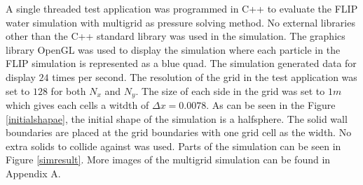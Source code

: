 A single threaded test application was programmed in C++ to evaluate the FLIP water simulation with multigrid as pressure solving method. No external libraries other than the C++ standard library was used in the simulation. The graphics library OpenGL was used to display the simulation where each particle in the FLIP simulation is represented as a blue quad. The simulation generated data for display $24$ times per second.
\newline
\newline
The resolution of the grid in the test application was set to $128$ for both $N_x$ and $N_y$. The size of each side in the grid was set to $1 m$ which gives each cells a witdth of $\Delta x = 0.0078$. As can be seen in the Figure \ref{initialshapae}, the initial shape of the simulation is a halfsphere. The solid wall boundaries are placed at the grid boundaries with one grid cell as the width. No extra solids to collide against was used. Parts of the simulation can be seen in Figure \ref{simresult}. More images of the multigrid simulation can be found in Appendix A. 

